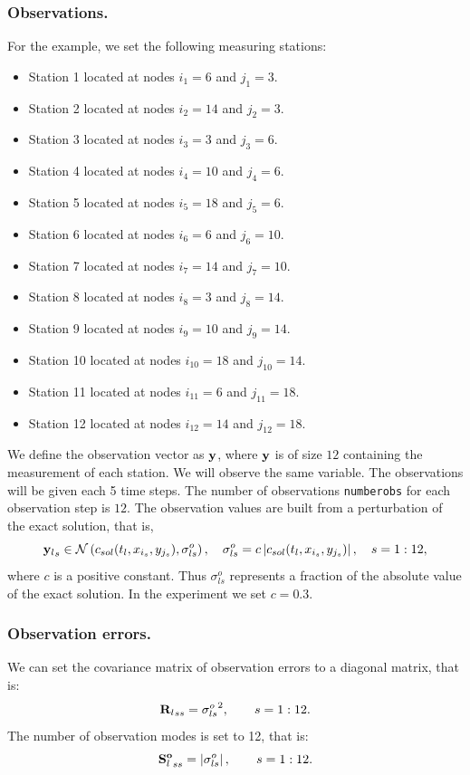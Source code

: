 \documentclass[12pt]{article}
\begin{document}
\subsubsection{Observations.}
For the example, we set the following measuring stations:
\begin{itemize}
\item Station 1 located at nodes $i_1 = 6$ and $j_1 = 3$.
\item Station 2 located at nodes $i_2 = 14$ and $j_2 = 3$.
\item Station 3 located at nodes $i_3 = 3$ and $j_3 = 6$.
\item Station 4 located at nodes $i_4 = 10$ and $j_4 = 6$.
\item Station 5 located at nodes $i_5 = 18$ and $j_5 = 6$.
\item Station 6 located at nodes $i_6 = 6$  and $j_6 = 10$.
\item Station 7 located at nodes $i_7 = 14$ and $j_7 = 10$.
\item Station 8 located at nodes $i_8 = 3$ and $j_8 = 14$.
\item Station 9 located at nodes $i_9 = 10$ and $j_9 = 14$.
\item Station 10 located at nodes $i_{10} = 18$ and $j_{10} = 14$.
\item Station 11 located at nodes $i_{11} = 6$ and $j_{11} = 18$.
\item Station 12 located at nodes $i_{12} = 14$ and $j_{12} = 18$.
\end{itemize}

We define the observation vector as ${\bf y}$, where ${\bf y}$ is of size $12$ containing the measurement of each station. We will observe the same variable. The observations will be given each 5 time steps. The number of observations {\tt numberobs} for each observation step is $12$. The observation values are built from a perturbation of the exact solution, that is,
\begin{equation}
{{\bf y}_l}_s \in \mathcal{N} \left( c_{sol}( t_l , x_{i_s} , y_{j_s} ) , {\sigma}_{ls}^o \right), \quad {\sigma}_{ls}^o = c \left| c_{sol}( t_l , x_{i_s} , y_{j_s} ) \right|, \quad s = 1 : 12,
\end{equation}
where $c$ is a positive constant. Thus ${\sigma}_{ls}^o$ represents a fraction of the absolute value of the exact solution. In the experiment we set $c = 0.3$.

\subsubsection{Observation errors.}
We can set the covariance matrix of observation errors to a diagonal matrix, that is:
\begin{equation}
{{\bf R}_l}_{ss} = {{\sigma}_{ls}^o}^2, \qquad s = 1 : 12.
\end{equation}
The number of observation modes is set to 12, that is:
\begin{equation}
{{\bf S}_l^{\bf o}}_{ss} = \left| {\sigma}_{ls}^o \right|, \qquad s = 1 : 12.
\end{equation}
\end{document}
